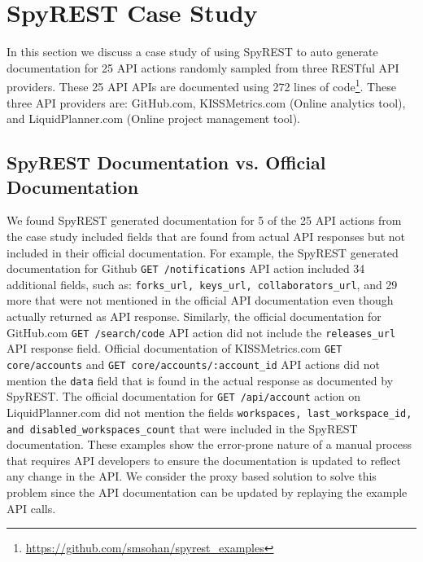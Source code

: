 \documentclass[conference]{IEEEtran}
\begin{document}
\section{SpyREST Case Study}
\label{sec:case_study}
In this section we discuss a case study of using SpyREST to auto generate documentation for 25 API actions randomly sampled from three RESTful API providers. These 25 API APIs are documented using 272 lines of code\footnote{\url{https://github.com/smsohan/spyrest_examples}}. These three API providers are: GitHub.com, KISSMetrics.com (Online analytics tool), and LiquidPlanner.com (Online project management tool).

\subsection{SpyREST Documentation vs. Official Documentation} %
\label{sub:spyrest_vs_official_documentation}

We found SpyREST generated documentation for 5 of the 25 API actions from the case study included fields that are found from actual API responses but not included in their official documentation. For example, the SpyREST generated documentation for Github \texttt{GET /notifications} API action included 34 additional fields, such as: \texttt{forks\_url, keys\_url, collaborators\_url}, and 29 more that were not mentioned in the official API documentation even though actually returned as API response. Similarly, the official documentation for GitHub.com \texttt{GET /search/code} API action did not include the \texttt{releases\_url} API response field. Official documentation of KISSMetrics.com \texttt{GET core/accounts} and \texttt{GET core/accounts/:account\_id} API actions did not mention the \texttt{data} field that is found in the actual response as documented by SpyREST. The official documentation for \texttt{GET /api/account} action on LiquidPlanner.com did not mention the fields \texttt{workspaces, last\_workspace\_id, and disabled\_workspaces\_count} that were included in the SpyREST documentation. These examples show the error-prone nature of a manual process that requires API developers to ensure the documentation is updated to reflect any change in the API. We consider the proxy based solution to solve this problem since the API documentation can be updated by replaying the example API calls.
\end{document}
